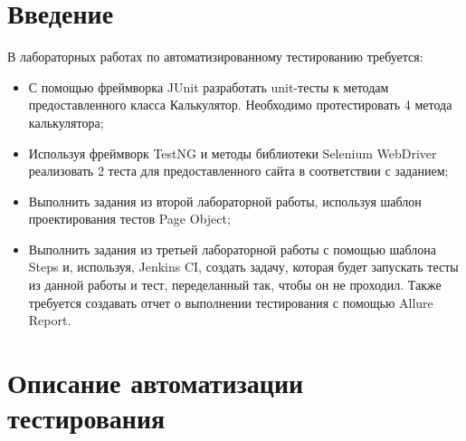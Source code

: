 \documentclass[a4paper]{article}
\begin{document}
    \section*{Введение}
    \noindent В лабораторных работах по автоматизированному тестированию требуется:
    \begin{itemize}
        \item С помощью фреймворка JUnit разработать unit-тесты к методам предоставленного класса Калькулятор. Необходимо протестировать 4 метода калькулятора;
        \item Используя фреймворк TestNG и методы библиотеки Selenium WebDriver реализовать 2 теста для предоставленного сайта в соответствии с заданием;
        \item Выполнить задания из второй лабораторной работы, используя шаблон проектирования тестов Page Object;
        \item Выполнить задания из третьей лабораторной работы с помощью шаблона Steps и, используя, Jenkins CI, создать задачу, которая будет запускать тесты из данной работы и тест, переделанный так, чтобы он не проходил. Также требуется создавать отчет о выполнении тестирования с помощью Allure Report.
    \end{itemize}
    \newpage

    \section{Описание автоматизации тестирования}
\end{document}
